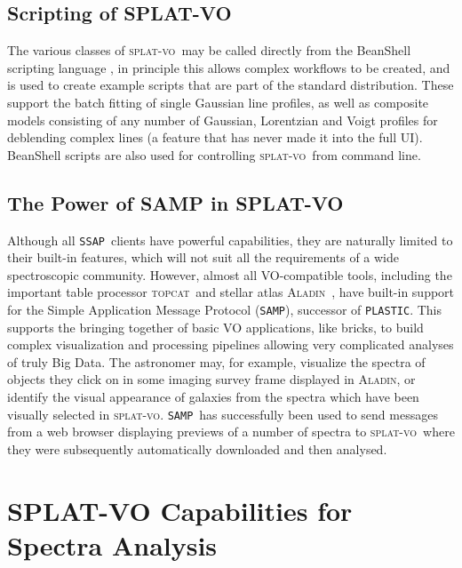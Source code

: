 \documentclass[final,authoryear,5p,times,twocolumn]{elsarticle}
\newcommand{\ssap}{\texttt{SSAP}}
\newcommand{\plastic}{\texttt{PLASTIC}}
\newcommand{\samp}{\texttt{SAMP}}
\newcommand{\splatvo}{\textsc{splat-vo}}
\newcommand{\topcat}{\textsc{topcat}}
\newcommand{\aladin}{\textsc{Aladin}}
\newcommand{\ascl}[1]{\href{http://www.ascl.net/#1}{ascl:#1}}
\begin{document}
\subsection{Scripting of SPLAT-VO}

The various classes of \splatvo\ may be called directly from the BeanShell
scripting language \citep{niemeyer2013learning}, in principle this allows
complex workflows to be created, and is used to create example scripts that
are part of the standard distribution. These support the batch fitting of
single Gaussian line profiles, as well as composite models consisting of any
number of Gaussian, Lorentzian and Voigt profiles for deblending complex lines
(a feature that has never made it into the full UI). BeanShell scripts are
also used for controlling \splatvo\ from command line.


\subsection{The Power of SAMP in SPLAT-VO}

Although all \ssap\ clients have powerful capabilities, they are naturally
limited to their built-in features, which will not suit all the requirements
of a wide spectroscopic community. However, almost all VO-compatible tools,
including the important table processor \topcat\ and stellar atlas \aladin\
\citep[][\ascl{1112.019}]{2005ASPC..347..193O}, have built-in support for the Simple Application Message
Protocol (\samp), successor of \plastic. This supports the bringing together of
basic VO applications, like bricks, to build complex visualization and
processing pipelines allowing very complicated analyses of truly Big Data.
The astronomer may, for example, visualize the spectra of objects they click
on in some imaging survey frame displayed in \aladin, or identify the visual
appearance of galaxies from the spectra which have been visually selected in
\splatvo. \samp\ has successfully been used to send messages from a web browser
displaying previews of a number of spectra to \splatvo\ where they were
subsequently automatically downloaded and then analysed.

\section{SPLAT-VO Capabilities  for Spectra Analysis}
\end{document}
